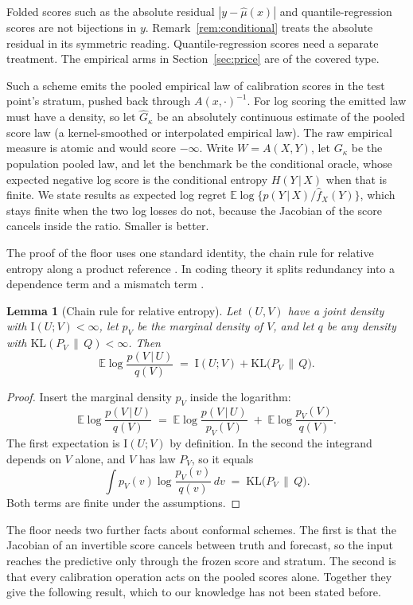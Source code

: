 \documentclass[11pt]{article}
\newtheorem{lemma}[proposition]{Lemma}
\theoremstyle{remark}
\newcommand{\E}{\mathbb{E}}
\newcommand{\I}{\mathrm{I}}
\newcommand{\given}{\,|\,}
\newcommand{\KLop}{\mathrm{KL}}
\begin{document}
Folded scores such as the absolute residual $|y-\widehat\mu(x)|$ and quantile-regression scores are not bijections in $y$.
Remark~\ref{rem:conditional} treats the absolute residual in its symmetric
reading. Quantile-regression scores need a separate treatment. The empirical
arms in Section~\ref{sec:price} are of the covered type.

Such a scheme emits the pooled empirical law of calibration scores in the test
point's stratum, pushed back through $A(x,\cdot)^{-1}$. For log scoring the
emitted law must have a density, so let $\widehat G_\kappa$ be an absolutely
continuous estimate of the pooled score law (a kernel-smoothed or interpolated
empirical law). The raw empirical measure is atomic and would score $-\infty$. Write
$W=A(X,Y)$, let $G_\kappa$ be the population pooled law, and let the benchmark
be the conditional oracle, whose expected negative log score is the conditional
entropy $H(Y\given X)$ when that is finite. We state results as expected log regret
$\E\log\{p(Y\given X)/\widehat f_X(Y)\}$, which stays finite when the two log losses do
not, because the Jacobian of the score cancels inside the ratio. Smaller is better.

The proof of the floor uses one standard identity, the chain rule for relative
entropy along a product reference \citep{cover2006elements}. In coding theory it
splits redundancy into a dependence term and a mismatch term
\citep{clarke1990,grunwald2007}.

\begin{lemma}[Chain rule for relative entropy]\label{lem:chain}
Let $(U,V)$ have a joint density with $\I(U;V)<\infty$, let $p_V$ be the marginal
density of $V$, and let $q$ be any density with $\KLop(P_V\,\|\,Q)<\infty$. Then
\[
\E\log\frac{p(V\given U)}{q(V)} \;=\; \I(U;V)+\KLop\!\big(P_V\,\|\,Q\big).
\]
\end{lemma}

\begin{proof}
Insert the marginal density $p_V$ inside the logarithm:
\[
\E\log\frac{p(V\given U)}{q(V)}
\;=\;\E\log\frac{p(V\given U)}{p_V(V)}\;+\;\E\log\frac{p_V(V)}{q(V)} .
\]
The first expectation is $\I(U;V)$ by definition. In the second the integrand
depends on $V$ alone, and $V$ has law $P_V$, so it equals
\[
\int p_V(v)\log\frac{p_V(v)}{q(v)}\,dv \;=\;\KLop\!\big(P_V\,\|\,Q\big).
\]
Both terms are finite under the assumptions.
\end{proof}

The floor needs two further facts about conformal schemes. The first is that the
Jacobian of an invertible score cancels between truth and forecast, so the input
reaches the predictive only through the frozen score and stratum. The second is that
every calibration operation acts on the pooled scores alone. Together they give the
following result, which to our knowledge has not been stated before.
\end{document}

